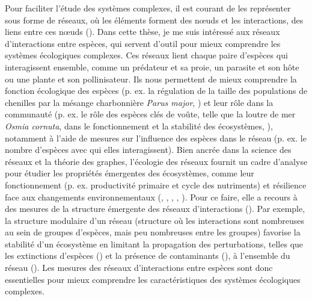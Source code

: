 Pour faciliter l'étude des systèmes complexes, il est courant de les représenter
sous forme de réseaux, où les éléments forment des nœuds et les interactions,
des liens entre ces nœuds (\cite{Newman2003Structure}). Dans cette thèse, je me
suis intéressé aux réseaux d'interactions entre espèces, qui servent d'outil
pour mieux comprendre les systèmes écologiques complexes. Ces réseaux lient
chaque paire d'espèces qui interagissent ensemble, comme un prédateur et sa
proie, un parasite et son hôte ou une plante et son pollinisateur. Ils nous
permettent de mieux comprendre la fonction écologique des espèces (p. ex. la
régulation de la taille des populations de chenilles par la mésange charbonnière
\textit{Parus major}, \cite{Harvey2017Bridging}) et leur rôle dans la communauté
(p. ex. le rôle des espèces clés de voûte, telle que la loutre de mer
\textit{Osmia cornuta}, dans le fonctionnement et la stabilité des écosystèmes,
\cite{Estes1998Killer}), notamment à l'aide de mesures sur l'influence des
espèces dans le réseau (p. ex. le nombre d'espèces avec qui elles
interagissent). Bien ancrée dans la science des réseaux et la théorie des
graphes, l'écologie des réseaux fournit un cadre d'analyse pour étudier les
propriétés émergentes des écosystèmes, comme leur fonctionnement (p. ex.
productivité primaire et cycle des nutriments) et résilience face aux
changements environnementaux (\cite{Proulx2005Network},
\cite{McCann2007Protecting}, \cite{McCann2011Food},
\cite{Rooney2012Integrating}, \cite{Valiente-Banuet2019Species}). Pour ce faire,
elle a recours à des mesures de la structure émergente des réseaux
d'interactions (\cite{Delmas2019Analysing}). Par exemple, la structure modulaire
d'un réseau (structure où les interactions sont nombreuses au sein de groupes
d'espèces, mais peu nombreuses entre les groupes) favorise la stabilité d'un
écosystème en limitant la propagation des perturbations, telles que les
extinctions d'espèces (\cite{Stouffer2011Compartmentalization}) et la présence
de contaminants (\cite{Garay-Narvaez2014Food}), à l'ensemble du réseau
(\cite{May1972Will}). Les mesures des réseaux d'interactions entre espèces sont
donc essentielles pour mieux comprendre les caractéristiques des systèmes
écologiques complexes. 

